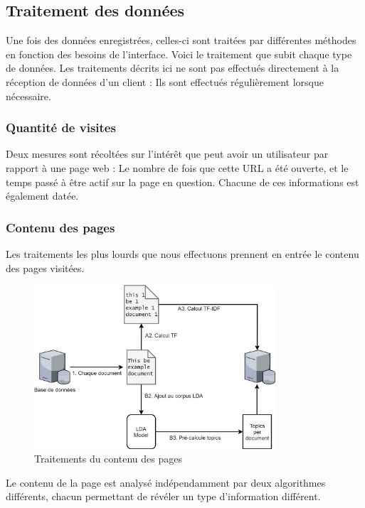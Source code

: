 	\subsection{Traitement des données}

		Une fois des données enregistrées, celles-ci sont traitées par différentes méthodes en fonction des besoins de l'interface. Voici le traitement que subit chaque type de données. Les traitements décrits ici ne sont pas effectués directement à la réception de données d'un client : Ils sont effectués régulièrement lorsque nécessaire.

		\subsubsection{Quantité de visites}

			Deux mesures sont récoltées sur l'intérêt que peut avoir un utilisateur par rapport à une page web : Le nombre de fois que cette URL a été ouverte, et le temps passé à être actif sur la page en question. Chacune de ces informations est également datée.

		\subsubsection{Contenu des pages}

			Les traitements les plus lourds que nous effectuons prennent en entrée le contenu des pages visitées.

			\begin{figure}[!h]
				\centering
				\includegraphics[width=0.8\textwidth]{images/design/traitement_offline}
				\caption{Traitements du contenu des pages}
				\label{d-traitements}
			\end{figure}

			Le contenu de la page est analysé indépendamment par deux algorithmes différents, chacun permettant de révéler un type d'information différent.


